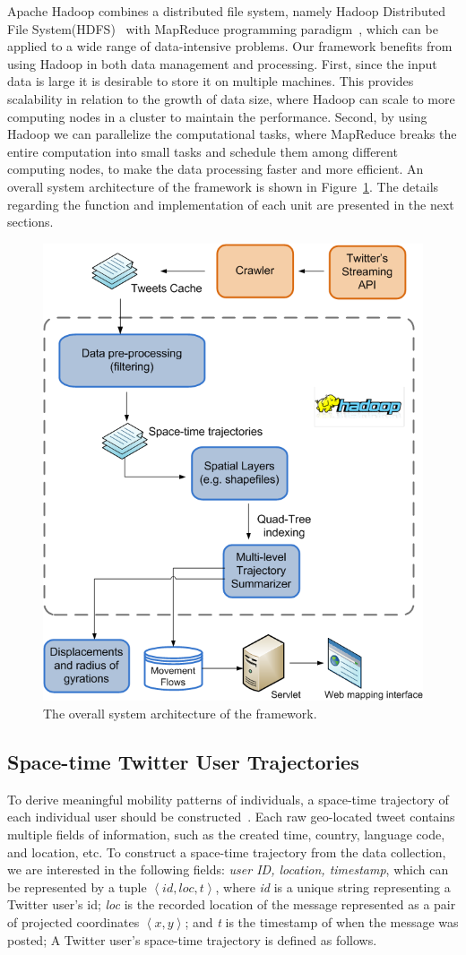 \documentclass[ijgi,article,accept,moreauthors,pdftex,10pt,a4paper]{mdpi}
\theoremstyle{mdpi}
\newcounter{ex}
\newcounter{re}
\theoremstyle{mdpidefinition}
\begin{document}
Apache Hadoop combines a distributed file system, namely Hadoop Distributed File System(HDFS)~\cite{shvachko2010hadoop} with MapReduce programming paradigm~\cite{dean2008mapreduce}, which can be applied to a wide range of data-intensive problems.
Our framework benefits from using Hadoop in both data management and processing.
First, since the input data is large it is desirable to store it on multiple machines.
This provides scalability in relation to the growth of data size, where Hadoop can scale to more computing nodes in a cluster to maintain the performance.
Second, by using Hadoop we can parallelize the computational tasks, where MapReduce breaks the entire computation into small tasks and schedule them among different computing nodes, to make the data processing faster and more efficient.
An overall system architecture of the framework is shown in Figure~\ref{fig:overall_archi}.
The details regarding the function and implementation of each unit are presented in the next sections.

\begin{figure}[ht]
\centering
\includegraphics[width=0.55\linewidth]{./figures/Overall_Architecture222}
\caption{The overall system architecture of the framework.}
\label{fig:overall_archi}
\end{figure}
\FloatBarrier

\subsection{Space-time Twitter User Trajectories}
To derive meaningful mobility patterns of individuals, a space-time trajectory of each individual user should be constructed~\cite{hagerstrand1985time}.
Each raw geo-located tweet contains multiple fields of information, such as the created time, country, language code, and location, etc.
To construct a space-time trajectory from the data collection, we are interested in the following fields: \textit{user ID, location, timestamp}, which can be represented by a tuple $\left\langle id, loc, t\right\rangle$, where \textit{id} is a unique string representing a Twitter user's id; \textit{loc} is the recorded location of the message represented as a pair of projected coordinates $\left\langle x, y\right\rangle$;
and \textit{t} is the timestamp of when the message was posted; A Twitter user's space-time trajectory is defined as follows.
\newline
\end{document}
